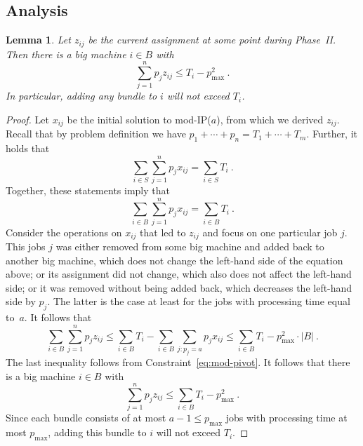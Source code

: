 \documentclass{article}
\newcommand{\mIP}{mod-IP($a$)}
\newtheorem{lemma}[theorem]{Lemma}
\begin{document}
\subsection{Analysis}
\begin{lemma}\label{lem:bundles}
	Let $z_{ij}$ be the current assignment at some point during Phase~II.
	Then there is a big machine $i\in B$ with
	\begin{equation*}
		\sum_{j=1}^n p_j z_{ij} \le T_i - p_{\max}^2 \ .
	\end{equation*}
	In particular, adding any bundle to $i$ will not exceed $T_i$.
\end{lemma}
\begin{proof}
	Let $x_{ij}$ be the initial solution to \mIP{}, from which we derived $z_{ij}$.
	Recall that by problem definition we have $p_1 + \cdots + p_n = T_1 + \cdots + T_m$. Further,
	it holds that
	\begin{equation*}
		\sum_{i\in S} \sum_{j=1}^n p_j x_{ij} = \sum_{i\in S} T_i \ .
	\end{equation*}
	Together, these statements imply that
	\begin{equation*}
		\sum_{i\in B} \sum_{j=1}^n p_j x_{ij} = \sum_{i\in B} T_i \ .
	\end{equation*}
	Consider the operations on $x_{ij}$ that led to $z_{ij}$ and focus on one particular job $j$.
	This jobs $j$ was either removed from some big machine and added back to another big machine,
	which does not change the left-hand side of the equation above; or its assignment did not change,
	which also does not affect the left-hand side; or it was removed without being added back,
	which decreases the left-hand side by $p_j$. The latter is the case at least for the jobs
	with processing time equal to~$a$. It follows that
	\begin{equation*}
		\sum_{i\in B} \sum_{j=1}^n p_j z_{ij} \le \sum_{i\in B} T_i - \sum_{i\in B}\sum_{j : p_j = a} p_j x_{ij} \le \sum_{i\in B} T_i - p_{\max}^2 \cdot |B| \ .
	\end{equation*}
	The last inequality follows from Constraint~\eqref{eq:mod-pivot}.
	It follows that there is a big machine $i\in B$ with
	\begin{equation*}
		\sum_{j=1}^n p_j z_{ij} \le \sum_{i\in B} T_i - p_{\max}^2 \ .
	\end{equation*}
	Since each bundle consists of at most $a - 1 \le p_{\max}$ jobs with processing time at most $p_{\max}$,
	adding this bundle to $i$ will not exceed $T_i$.
\end{proof}
\end{document}
